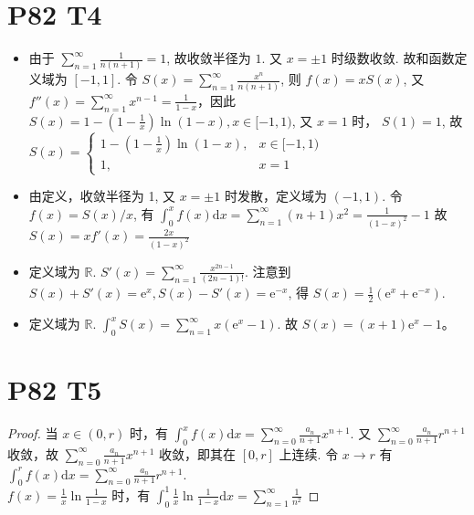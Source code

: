 \documentclass{article}
\begin{document}
\section*{P82 T4}

\begin{itemize}
    \item [(4)] 由于 $\sum_{n = 1}^{\infty}\frac{1}{n(n + 1)} = 1$, 故收敛半径为 $1$. 又 $x = \pm 1$ 时级数收敛. 故和函数定义域为 $[-1, 1]$. 令 $S(x) = \sum_{n = 1}^{\infty}\frac{x^n}{n(n + 1)}$, 则 $f(x) = xS(x)$, 又 $f''(x) = \sum_{n = 1}^{\infty}x^{n - 1} = \frac{1}{1 - x}$，因此 $S(x) = 1 - \left(1 - \frac{1}{x}\right)\ln (1 - x), x \in [-1, 1)$, 又 $x = 1$ 时， $S(1) = 1$, 故 $S(x) = \begin{cases}
        1 - \left(1 - \frac{1}{x}\right)\ln (1 - x), & x \in [-1, 1) \\
        1, & x = 1
    \end{cases}$
    \item [(5)] 由定义，收敛半径为 1, 又 $x = \pm 1$ 时发散，定义域为 $(-1, 1)$. 令 $f(x) = S(x)/x$, 有 $\int_{0}^{x}f(x)\mathrm{d}x = \sum_{n = 1}^{\infty}(n + 1)x^2 = \frac{1}{(1 - x)^2} - 1$ 故 $S(x) = xf'(x) = \frac{2x}{(1 - x)^2}$
    \item [(6)] 定义域为 $\mathbb{R}$. $S'(x) = \sum_{n = 1}^{\infty}\frac{x^{2n - 1}}{(2n - 1)!}$. 注意到 $S(x) + S'(x) = \mathrm{e}^x, S(x) - S'(x) = \mathrm{e}^{-x}$, 得 $S(x) = \frac{1}{2}(\mathrm{e}^x + \mathrm{e}^{-x})$.
    \item [(7)] 定义域为 $\mathbb{R}$. $\int_{0}^{x}S(x) = \sum_{n = 1}^{\infty}x(\mathrm{e}^x - 1)$. 故 $S(x) = (x + 1)\mathrm{e}^x - 1$。
\end{itemize}

\section*{P82 T5}

\begin{proof}
    当 $x \in (0, r)$ 时，有 $\int_{0}^{x}f(x) \mathrm{d}x = \sum_{n = 0}^{\infty}\frac{a_n}{n + 1}x^{n + 1}$. 又 $\sum_{n = 0}^{\infty}\frac{a_n}{n + 1}r^{n + 1}$ 收敛，故 $\sum_{n = 0}^{\infty}\frac{a_n}{n + 1}x^{n + 1}$ 收敛，即其在 $[0, r]$ 上连续. 令 $x \to r$ 有 $\int_{0}^{r}f(x) \mathrm{d}x = \sum_{n = 0}^{\infty}\frac{a_n}{n + 1}r^{n + 1}$. \\
    $f(x) = \frac{1}{x}\ln\frac{1}{1 - x}$ 时，有 $\int_{0}^{1}\frac{1}{x}\ln \frac{1}{1 - x}\mathrm{d}x = \sum_{n = 1}^{\infty}\frac{1}{n^2}$
\end{proof}
\end{document}
